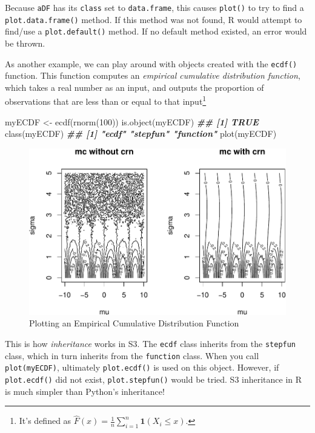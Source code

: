 \documentclass[
  12pt,
  krantz2]{krantz}
\makeatletter
\newenvironment{Shaded}{\begin{snugshade}}{\end{snugshade}}
\newcommand{\DecValTok}[1]{\textcolor[rgb]{0.06,0.06,0.06}{#1}}
\newcommand{\DocumentationTok}[1]{\textcolor[rgb]{0.37,0.37,0.37}{\textbf{\textit{#1}}}}
\newcommand{\FunctionTok}[1]{\textcolor[rgb]{0,0,0}{#1}}
\newcommand{\NormalTok}[1]{#1}
\newcommand{\OtherTok}[1]{\textcolor[rgb]{0.37,0.37,0.37}{#1}}
\newenvironment{kframe}{%
\medskip{}
\setlength{\fboxsep}{.8em}
 \def\at@end@of@kframe{}%
 \ifinner\ifhmode%
  \def\at@end@of@kframe{\end{minipage}}%
  \begin{minipage}{\columnwidth}%
 \fi\fi%
 \def\FrameCommand##1{\hskip\@totalleftmargin \hskip-\fboxsep
 \colorbox{shadecolor}{##1}\hskip-\fboxsep
     \hskip-\linewidth \hskip-\@totalleftmargin \hskip\columnwidth}%
 \MakeFramed {\advance\hsize-\width
   \@totalleftmargin\z@ \linewidth\hsize
   \@setminipage}}%
 {\par\unskip\endMakeFramed%
 \at@end@of@kframe}
\renewenvironment{Shaded}{\begin{kframe}}{\end{kframe}}
\makeatother
\begin{document}
Because \texttt{aDF} has its \texttt{class} set to \texttt{data.frame}, this causes \texttt{plot()} to try to find a \texttt{plot.data.frame()} method. If this method was not found, R would attempt to find/use a \texttt{plot.default()} method. If no default method existed, an error would be thrown.

As another example, we can play around with objects created with the \texttt{ecdf()} function. This function computes an \emph{empirical cumulative distribution function}, which takes a real number as an input, and outputs the proportion of observations that are less than or equal to that input\footnote{It's defined as \(\hat{F}(x) = \frac{1}{n}\sum_{i=1}^n \mathbf{1}(X_i \le x)\).}

\begin{Shaded}
\begin{Highlighting}[]
\NormalTok{myECDF }\OtherTok{\textless{}{-}} \FunctionTok{ecdf}\NormalTok{(}\FunctionTok{rnorm}\NormalTok{(}\DecValTok{100}\NormalTok{))}
\FunctionTok{is.object}\NormalTok{(myECDF)}
\DocumentationTok{\#\# [1] TRUE}
\FunctionTok{class}\NormalTok{(myECDF)}
\DocumentationTok{\#\# [1] "ecdf"     "stepfun"  "function"}
\FunctionTok{plot}\NormalTok{(myECDF)}
\end{Highlighting}
\end{Shaded}

\begin{figure}

{\centering \includegraphics[width=0.8\linewidth]{r_and_python_book_files/figure-latex/unnamed-chunk-245-1} 

}

\caption{Plotting an Empirical Cumulative Distribution Function}\label{fig:unnamed-chunk-245}
\end{figure}

This is how \emph{inheritance} works in S3. The \texttt{ecdf} class inherits from the \texttt{stepfun} class, which in turn inherits from the \texttt{function} class. When you call \texttt{plot(myECDF)}, ultimately \texttt{plot.ecdf()} is used on this object. However, if \texttt{plot.ecdf()} did not exist, \texttt{plot.stepfun()} would be tried. S3 inheritance in R is much simpler than Python's inheritance!
\end{document}
